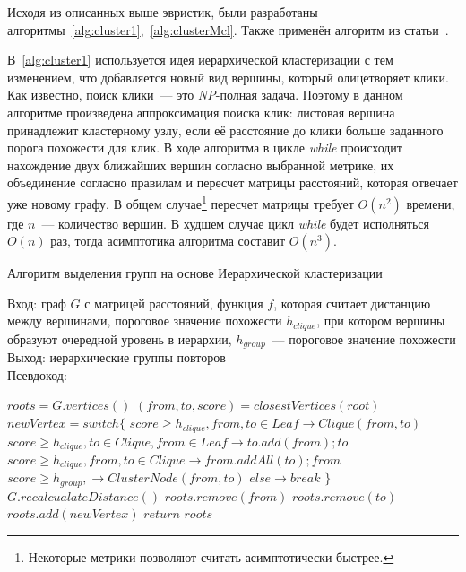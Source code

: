 Исходя из описанных выше эвристик, были разработаны алгоритмы~\ref{alg:cluster1},~\ref{alg:clusterMcl}.
Также применён алгоритм из статьи~\cite{tofigh2009optimum}.

В~\ref{alg:cluster1} используется идея иерархической кластеризации с тем изменением, что добавляется новый вид вершины, который олицетворяет клики.
Как известно, поиск клики~--- это \emph{NP}-полная задача.
Поэтому в данном алгоритме произведена аппроксимация поиска клик: листовая вершина принадлежит кластерному узлу, если её расстояние до клики больше заданного порога похожести для клик.
В ходе алгоритма в цикле \emph{while} происходит нахождение двух ближайших вершин согласно выбранной метрике, их объединение согласно правилам и пересчет матрицы расстояний, которая отвечает уже новому графу.
В общем случае\footnote{Некоторые метрики позволяют считать асимптотически быстрее.} пересчет матрицы требует $O(n^2)$ времени, где $n$~--- количество вершин.
В худшем случае  цикл \emph{while} будет исполняться $O(n)$ раз,
тогда асимптотика алгоритма составит $O(n^3)$.

\begin{algorithm}[t!]
\caption{Алгоритм выделения групп на основе Иерархической кластеризации}\label{alg:cluster1}
Вход: граф $G$ с матрицей расстояний, функция  $f$, которая считает дистанцию между вершинами, пороговое значение похожести $h_{clique}$, при котором вершины образуют очередной уровень в иерархии, $h_{group}$~--- пороговое значение похожести\\
Выход: иерархические группы повторов \\
Псевдокод:
\begin{algorithmic}[1]
\State $roots = G.vertices()$
\State $(from, to,score) = closestVertices(root)$
\State $newVertex = switch \{$
\State $score\geq h_{clique} , from,to \in Leaf \rightarrow Clique(from,to) $
\State $score\geq h_{clique} , to \in Clique,from \in Leaf \rightarrow to.add(from);to $
\State $score\geq h_{clique} , from,to \in Clique \rightarrow from.addAll(to);from$
\State $score\geq h_{group}, \rightarrow ClusterNode(from,to) $
\State $else \rightarrow break$ 
\State $\}$
\State $G.recalcualateDistance()$
\State $roots.remove(from)$
\State $roots.remove(to)$
\State $roots.add(newVertex)$
\EndWhile
\State $return$ $roots$
\end{algorithmic}
\end{algorithm}

